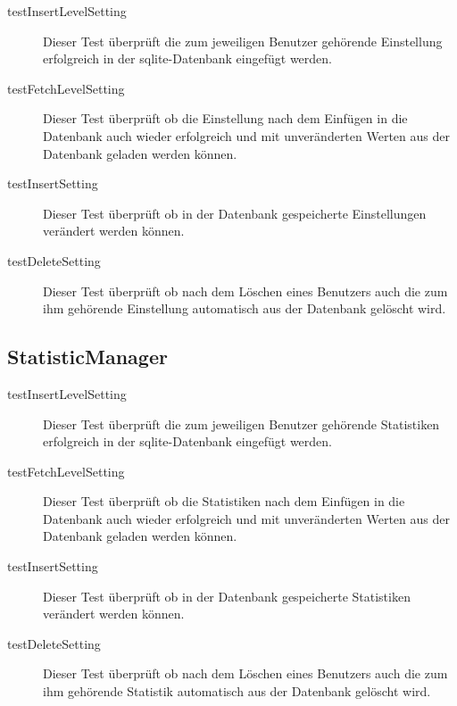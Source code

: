 \begin{description}

\item[testInsertLevelSetting]
Dieser Test überprüft die zum jeweiligen Benutzer gehörende Einstellung erfolgreich in der sqlite-Datenbank eingefügt werden. 

\item[testFetchLevelSetting]
Dieser Test überprüft ob die Einstellung nach dem Einfügen in die Datenbank auch wieder erfolgreich und mit unveränderten Werten aus der Datenbank geladen werden können.

\item[testInsertSetting]
Dieser Test überprüft ob in der Datenbank gespeicherte Einstellungen verändert werden können.

\item[testDeleteSetting]
Dieser Test überprüft ob nach dem Löschen eines Benutzers auch die zum ihm gehörende Einstellung automatisch aus der Datenbank gelöscht wird.

\end{description}

\subsection{StatisticManager}

\begin{description}

\item[testInsertLevelSetting]
Dieser Test überprüft die zum jeweiligen Benutzer gehörende Statistiken erfolgreich in der sqlite-Datenbank eingefügt werden. 

\item[testFetchLevelSetting]
Dieser Test überprüft ob die Statistiken nach dem Einfügen in die Datenbank auch wieder erfolgreich und mit unveränderten Werten aus der Datenbank geladen werden können.

\item[testInsertSetting]
Dieser Test überprüft ob in der Datenbank gespeicherte Statistiken verändert werden können.

\item[testDeleteSetting]
Dieser Test überprüft ob nach dem Löschen eines Benutzers auch die zum ihm gehörende Statistik automatisch aus der Datenbank gelöscht wird.

\end{description}


